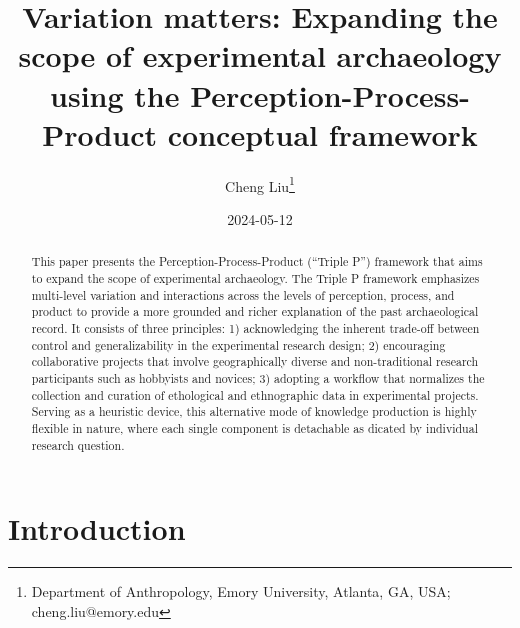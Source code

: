 \documentclass[
  11pt,
  letterpaper,
  DIV=11,
  numbers=noendperiod]{scrartcl}
\title{Variation matters: Expanding the scope of experimental
archaeology using the Perception-Process-Product conceptual framework}
\author{Cheng Liu\footnote{Department of Anthropology, Emory University,
  Atlanta, GA, USA; cheng.liu@emory.edu}}
\date{2024-05-12}
\begin{document}
\maketitle
\begin{abstract}
This paper presents the Perception-Process-Product (``Triple P'')
framework that aims to expand the scope of experimental archaeology. The
Triple P framework emphasizes multi-level variation and interactions
across the levels of perception, process, and product to provide a more
grounded and richer explanation of the past archaeological record. It
consists of three principles: 1) acknowledging the inherent trade-off
between control and generalizability in the experimental research
design; 2) encouraging collaborative projects that involve
geographically diverse and non-traditional research participants such as
hobbyists and novices; 3) adopting a workflow that normalizes the
collection and curation of ethological and ethnographic data in
experimental projects. Serving as a heuristic device, this alternative
mode of knowledge production is highly flexible in nature, where each
single component is detachable as dicated by individual research
question.
\end{abstract}


\section{Introduction}\label{introduction}
\end{document}
